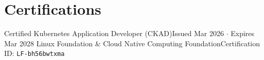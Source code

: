 \section{Certifications}
    \resumeSubHeadingListStart

      \resumeSubheading
      {Certified Kubernetes Application Developer (CKAD)}{Issued Mar 2026 $\cdot$ Expires Mar 2028}
      {Linux Foundation \& Cloud Native Computing Foundation}{Certification ID: \texttt{LF-bh56bwtxma}}

    \resumeSubHeadingListEnd
